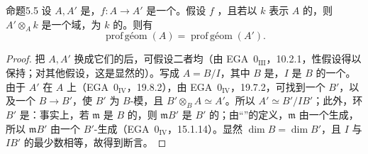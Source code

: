 \begin{SGAresult}{命题}{5.5}
设 $A,A'$ 是，$f:A\to A'$ 是一个。假设 $f$ ，且若以 $k$ 表示 $A$ 的，则 $A'\otimes_Ak$ 是一个域，为 $k$ 的。则有
\[
\operatorname{prof\,\text{géom}}(A)=\operatorname{prof\,\text{géom}}(A').
\]
\end{SGAresult}
\begin{proof}
把 $A,A'$ 换成它们的后，可假设二者均（由 EGA~$0_{\mathrm{III}}$，10.2.1，性假设得以保持；对其他假设，这是显然的）。写成 $A=B/I$，其中 $B$ 是，$I$ 是 $B$ 的一个。由于 $A'$ 在 $A$ 上（EGA~$0_{\mathrm{IV}}$，19.8.2），由 EGA~$0_{\mathrm{IV}}$，19.7.2，可找到一个 $B'$，以及一个 $B\to B'$，使 $B'$ 为 $B$-模，且 $B'\otimes_BA\simeq A'$。所以 $A'\simeq B'/IB'$；此外，环 $B'$ 是：事实上，若 $\mathfrak m$ 是 $B$ 的，则 $\mathfrak mB'$ 是 $B'$ 的；由“”的定义，$\mathfrak m$ 由一个生成，所以 $\mathfrak mB'$ 由一个 $B'$-生成（EGA~$0_{\mathrm{IV}}$，15.1.14）。显然 $\dim B=\dim B'$，且 $I$ 与 $IB'$ 的最少数相等，故得到断言。
\end{proof}

